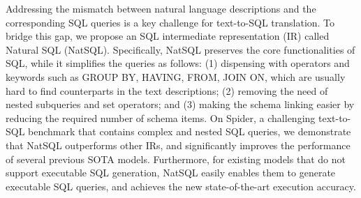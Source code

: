 Addressing the mismatch between natural language descriptions and the corresponding SQL queries is a key challenge for text-to-SQL translation. To bridge this gap, we propose an SQL intermediate representation (IR) called Natural SQL (NatSQL). Specifically, NatSQL preserves the core functionalities of SQL, while it simplifies the queries as follows: (1) dispensing with operators and keywords such as GROUP BY, HAVING, FROM, JOIN ON, which are usually hard to find counterparts in the text descriptions; (2) removing the need of nested subqueries and set operators; and (3) making the schema linking easier by reducing the required number of schema items. On Spider, a challenging text-to-SQL benchmark that contains complex and nested SQL queries, we demonstrate that NatSQL outperforms other IRs, and significantly improves the performance of several previous SOTA models. Furthermore, for existing models that do not support executable SQL generation, NatSQL easily enables them to generate executable SQL queries, and achieves the new state-of-the-art execution accuracy.
